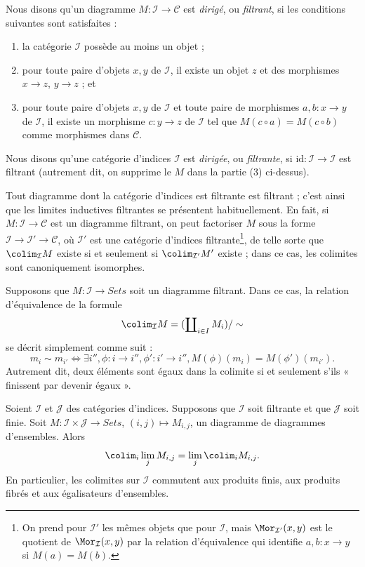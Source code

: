 \begin{definition}
\label{definition-directed}
Nous disons qu'un diagramme $M : \mathcal{I} \to \mathcal{C}$ est
{\it dirigé}, ou {\it filtrant}, si les conditions suivantes sont satisfaites :
\begin{enumerate}
\item la catégorie $\mathcal{I}$ possède au moins un objet ;
\item pour toute paire d'objets $x, y$ de $\mathcal{I}$,
il existe un objet $z$ et des morphismes $x \to z$,
$y \to z$ ; et
\item pour toute paire d'objets $x, y$ de $\mathcal{I}$
et toute paire de morphismes $a, b : x \to y$ de $\mathcal{I}$,
il existe un morphisme $c : y \to z$ de $\mathcal{I}$
tel que $M(c \circ a) = M(c \circ b)$ comme morphismes dans $\mathcal{C}$.
\end{enumerate}
Nous disons qu'une catégorie d'indices $\mathcal{I}$ est
{\it dirigée}, ou {\it filtrante}, si
$\text{id} : \mathcal{I} \to \mathcal{I}$ est filtrant
(autrement dit, on supprime le $M$ dans la partie (3) ci-dessus).
\end{definition}

\noindent
Tout diagramme dont la catégorie d'indices est filtrante est filtrant ;
c'est ainsi que les limites inductives filtrantes se présentent habituellement.
En fait, si $M : \mathcal{I} \to \mathcal{C}$ est un diagramme filtrant,
on peut factoriser $M$ sous la forme
$\mathcal{I} \to \mathcal{I}' \to \mathcal{C}$,
où $\mathcal{I}'$ est une catégorie d'indices
filtrante\footnote{On prend pour $\mathcal{I}'$ les mêmes objets que pour
$\mathcal{I}$, mais $\Mor_{\mathcal{I}'}(x, y)$ est le quotient de
$\Mor_\mathcal{I}(x, y)$ par la relation d'équivalence qui identifie
$a, b : x \to y$ si $M(a) = M(b)$.},
de telle sorte que $\colim_\mathcal{I} M$ existe si et seulement si
$\colim_{\mathcal{I}'} M'$ existe ; dans ce cas, les colimites sont
canoniquement isomorphes.

\medskip\noindent
Supposons que $M : \mathcal{I} \to \textit{Sets}$ soit un diagramme filtrant.
Dans ce cas, la relation d'équivalence de la formule
$$
\colim_\mathcal{I} M
=
(\coprod\nolimits_{i\in I} M_i)/\sim
$$
se décrit simplement comme suit :
$$
m_i \sim m_{i'}
\Leftrightarrow
\exists i'', \phi : i \to i'', \phi': i' \to i'',
M(\phi)(m_i) = M(\phi')(m_{i'}).
$$
Autrement dit, deux éléments sont égaux dans la colimite si et seulement
s'ils « finissent par devenir égaux ».

\begin{lemma}
\label{lemma-directed-commutes}
Soient $\mathcal{I}$ et $\mathcal{J}$ des catégories d'indices.
Supposons que $\mathcal{I}$ soit filtrante et que $\mathcal{J}$ soit finie.
Soit $M : \mathcal{I} \times \mathcal{J} \to \textit{Sets}$,
$(i, j) \mapsto M_{i, j}$, un diagramme de diagrammes d'ensembles.
Alors
$$
\colim_i \lim_j M_{i, j}
=
\lim_j \colim_i M_{i, j}.
$$
En particulier, les colimites sur $\mathcal{I}$ commutent aux produits finis,
aux produits fibrés et aux égalisateurs d'ensembles.
\end{lemma}

